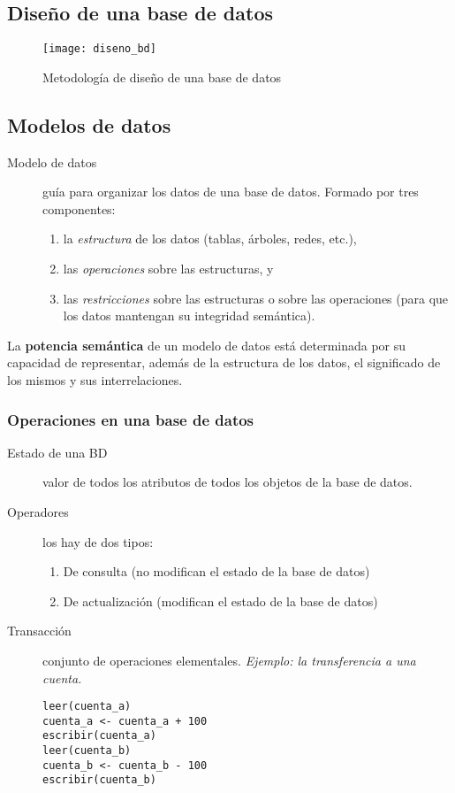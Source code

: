 \documentclass[a4paper, twoside]{article}
\begin{document}
\subsection{Diseño de una base de datos}
\begin{figure}[H]
	\centering
	\texttt{[image: diseno\_bd]}
	\caption{Metodología de diseño de una base de datos}
\end{figure}

\subsection{Modelos de datos}
\begin{description}
	\item[Modelo de datos] guía para organizar los datos de una base de datos. Formado por tres componentes: 
	\begin{enumerate}
		\item la \emph{estructura} de los datos (tablas, árboles, redes, etc.),
		\item las \emph{operaciones} sobre las estructuras, y
		\item las \emph{restricciones} sobre las estructuras o sobre las operaciones (para que los datos mantengan su integridad semántica).
	\end{enumerate}
\end{description}

La \textbf{potencia semántica} de un modelo de datos está determinada por su capacidad de representar, además de la estructura de los datos, el significado de los mismos y sus interrelaciones.

\subsubsection{Operaciones en una base de datos}
\begin{description}
	\item[Estado de una BD] valor de todos los atributos de todos los objetos de la base de datos.
	\item[Operadores] los hay de dos tipos:
	\begin{enumerate}
		\item De consulta (no modifican el estado de la base de datos)
		\item De actualización (modifican el estado de la base de datos)
	\end{enumerate}
	\item[Transacción] conjunto de operaciones elementales. \emph{Ejemplo: la transferencia a una cuenta.}
	\begin{lstlisting}
leer(cuenta_a)
cuenta_a <- cuenta_a + 100
escribir(cuenta_a)
leer(cuenta_b)
cuenta_b <- cuenta_b - 100
escribir(cuenta_b)
	\end{lstlisting}
\end{description}
\end{document}
